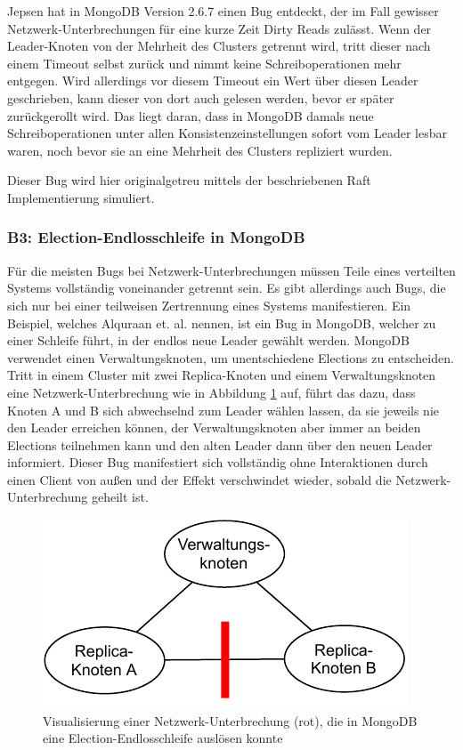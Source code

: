 \documentclass[12pt,a4paper]{report}
\begin{document}
Jepsen hat in MongoDB Version 2.6.7 einen Bug entdeckt, der im Fall gewisser Netzwerk-Unterbrechungen für eine kurze Zeit Dirty
Reads zulässt. Wenn der Leader-Knoten von der Mehrheit des Clusters getrennt wird, tritt dieser nach einem Timeout selbst zurück
und nimmt keine Schreiboperationen mehr entgegen. Wird allerdings vor diesem Timeout ein Wert über diesen Leader geschrieben, kann
dieser von dort auch gelesen werden, bevor er später zurückgerollt wird. Das liegt daran, dass in MongoDB damals neue
Schreiboperationen unter allen Konsistenzeinstellungen sofort vom Leader lesbar waren, noch bevor sie an eine Mehrheit des
Clusters repliziert wurden. \cite{jepsen_mongo_analysis}

Dieser Bug wird hier originalgetreu mittels der beschriebenen Raft Implementierung simuliert.

\subsubsection{B3: Election-Endlosschleife in MongoDB}
Für die meisten Bugs bei Netzwerk-Unterbrechungen müssen Teile eines verteilten Systems vollständig voneinander getrennt sein. Es
gibt allerdings auch Bugs, die sich nur bei einer teilweisen Zertrennung eines Systems manifestieren. Ein Beispiel, welches
Alquraan et. al. \cite{analysis_of_network_partition_failures} nennen, ist ein Bug in MongoDB, welcher zu einer Schleife führt, in
der endlos neue Leader gewählt werden. MongoDB verwendet einen Verwaltungsknoten, um unentschiedene Elections zu entscheiden.
Tritt in einem Cluster mit zwei Replica-Knoten und einem Verwaltungsknoten eine Netzwerk-Unterbrechung wie in Abbildung
\ref{fig:partial_partition} auf, führt das dazu, dass Knoten A und B sich abwechselnd zum Leader wählen lassen, da sie jeweils nie
den Leader erreichen können, der Verwaltungsknoten aber immer an beiden Elections teilnehmen kann und den alten Leader dann über
den neuen Leader informiert. Dieser Bug manifestiert sich vollständig ohne Interaktionen durch einen Client von außen und
der Effekt verschwindet wieder, sobald die Netzwerk-Unterbrechung geheilt ist.

\begin{figure}[H]
	\centering
	\includegraphics[width=0.6\linewidth]{img/ditm-Partitions.pdf}
	\caption{Visualisierung einer Netzwerk-Unterbrechung (rot), die in MongoDB eine Election-Endlosschleife auslösen konnte}
	\label{fig:partial_partition}
\end{figure}
\end{document}
